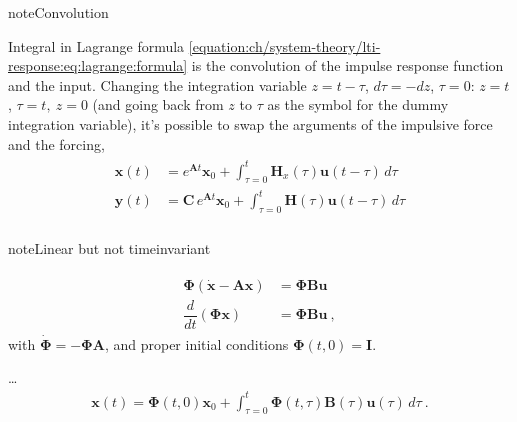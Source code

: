 \documentclass[letterpaper,10pt,english]{jupyterBook}
\begin{document}
\begin{sphinxadmonition}{note}{Convolution}

\sphinxAtStartPar
Integral in Lagrange formula \eqref{equation:ch/system-theory/lti-response:eq:lagrange:formula} is the convolution of the impulse response function and the input. Changing the integration variable \(z = t - \tau\), \(d\tau = - dz\), \(\tau = 0: \, z = t\), \(\tau = t, \ z = 0\) (and going back from \(z\) to \(\tau\) as the symbol for the dummy integration variable), it’s possible to swap the arguments of the impulsive force and the forcing,
\begin{equation}\label{equation:ch/system-theory/lti-response:eq:lagrange:convol}
\begin{split}\begin{aligned}
  \mathbf{x}(t) & = e^{\mathbf{A} t} \mathbf{x}_0 + \int_{\tau=0}^{t} \mathbf{H}_x(\tau) \mathbf{u}(t-\tau) \, d \tau \\
  \mathbf{y}(t) & = \mathbf{C} \, e^{\mathbf{A} t} \mathbf{x}_0 + \int_{\tau=0}^{t} \mathbf{H}(\tau) \mathbf{u}(t-\tau) \, d \tau \\
\end{aligned}\end{split}
\end{equation}\end{sphinxadmonition}

\begin{sphinxadmonition}{note}{Linear but not time\sphinxhyphen{}invariant}

\sphinxAtStartPar
{} 
\begin{equation*}
\begin{split}\begin{aligned}
  \boldsymbol{\Phi} \left( \dot{\mathbf{x}} - \mathbf{A}\mathbf{x} \right) & = \boldsymbol{\Phi} \mathbf{B} \mathbf{u} \\
  \dfrac{d}{dt} \left( \boldsymbol{\Phi} \mathbf{x} \right) & = \boldsymbol{\Phi} \mathbf{B} \mathbf{u} \ ,
\end{aligned}\end{split}
\end{equation*}
\sphinxAtStartPar
with \(\dot{\boldsymbol{\Phi}} = - \boldsymbol{\Phi} \mathbf{A}\), and proper initial conditions \(\boldsymbol{\Phi}(t,0) = \mathbf{I}\).

\sphinxAtStartPar
…
\begin{equation*}
\begin{split}\mathbf{x}(t) = \boldsymbol{\Phi}(t,0) \mathbf{x}_0 + \int_{\tau=0}^{t} \boldsymbol{\Phi}(t, \tau) \mathbf{B}(\tau) \mathbf{u}(\tau) \, d \tau \ .\end{split}
\end{equation*}\end{sphinxadmonition}
\end{document}
